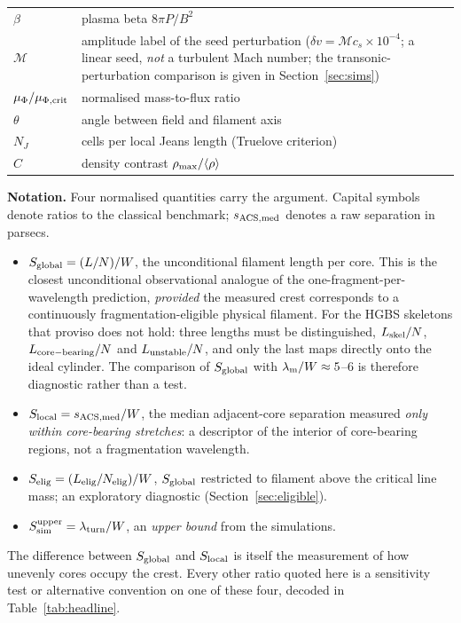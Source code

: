 \documentclass[usenatbib,twoside,twocolumn]{mnras}
\begin{document}
\begin{table}
\begin{tabular}{lp{6.1cm}}
$\beta$ & plasma beta $8\pi P/B^2$ \\
$\mathcal{M}$ & amplitude label of the seed perturbation ($\delta v=\mathcal{M}c_s\times10^{-4}$; a linear seed, \emph{not} a turbulent Mach number; the transonic-perturbation comparison is given in Section~\ref{sec:sims}) \\
$\mu_\Phi/\mu_{\Phi,\rm crit}$ & normalised mass-to-flux ratio \\
$\theta$ & angle between field and filament axis \\
$N_J$ & cells per local Jeans length (Truelove criterion) \\
$C$ & density contrast $\rho_{\rm max}/\langle\rho\rangle$ \\
\bottomrule
\end{tabular}
\end{table}

\label{sec:intro_notation}
\noindent\textbf{Notation.} Four normalised quantities carry the argument. Capital symbols denote ratios to the classical benchmark; $s_{\rm ACS,med}$ denotes a raw separation in parsecs.
\begin{itemize}\setlength{\itemsep}{1pt}
\item $S_{\rm global}=(L/N)/W$, the unconditional filament length per core. This is the closest unconditional observational analogue of the one-fragment-per-wavelength prediction, \emph{provided} the measured crest corresponds to a continuously fragmentation-eligible physical filament. For the HGBS skeletons that proviso does not hold: three lengths must be distinguished, $L_{\rm skel}/N$, $L_{\rm core-bearing}/N$ and $L_{\rm unstable}/N$, and only the last maps directly onto the ideal cylinder. The comparison of $S_{\rm global}$ with $\lambda_{\rm m}/W\approx5$--$6$ is therefore diagnostic rather than a test.
\item $S_{\rm local}=s_{\rm ACS,med}/W$, the median adjacent-core separation measured \emph{only within core-bearing stretches}: a descriptor of the interior of core-bearing regions, not a fragmentation wavelength.
\item $S_{\rm elig}=(L_{\rm elig}/N_{\rm elig})/W$, $S_{\rm global}$ restricted to filament above the critical line mass; an exploratory diagnostic (Section~\ref{sec:eligible}).
\item $S_{\rm sim}^{\rm upper}=\lambda_{\rm turn}/W$, an \emph{upper bound} from the simulations.
\end{itemize}
The difference between $S_{\rm global}$ and $S_{\rm local}$ is itself the measurement of how unevenly cores occupy the crest. Every other ratio quoted here is a sensitivity test or alternative convention on one of these four, decoded in Table~\ref{tab:headline}.
\end{document}
